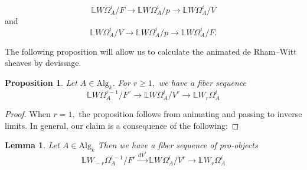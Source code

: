 \documentclass[10pt,letterpaper]{amsart}
\makeatletter
\newcommand{\smallbullet}{} %
\DeclareRobustCommand\smallbullet{%
  \mathord{\mathpalette\smallbullet@{0.7}}%
}
\newcommand{\smallbullet@}[2]{%
  \vcenter{\hbox{\scalebox{#2}{$\m@th#1\bullet$}}}%
}
\numberwithin{figure}{section}
\numberwithin{equation}{section}
\newtheorem{lemma}[figure]{Lemma}
\newtheorem{proposition}[figure]{Proposition}
\theoremstyle{definition}
\theoremstyle{definition}
\theoremstyle{definition}
\theoremstyle{definition}
\newcommand{\LL}{\L}
\renewcommand{\L}{\mathbb{L}}
\makeatother
\begin{document}
\begin{equation}\label{eq200}
    \L W \Omega^i_A /F \to \L W \Omega^i_A/p \to \L W \Omega^i_A/V
\end{equation}and
\begin{equation}\label{eq201}
 \L W \Omega^i_A/V \to \L W \Omega^i_A/p \to \L W \Omega^i_A /F.
\end{equation}{}


The following proposition will allow us to calculate the animated de Rham--Witt sheaves by devissage.

\begin{proposition}\label{Illusieprop}
Let $A \in \mathrm{Alg}_k.$ For $r \ge 1,$ we have a fiber sequence
$$ \L W\Omega^{i-1}_A/F^r \to \L W\Omega^i_A/V^r \to \L W_r\Omega^i_A  $$
\end{proposition}{}

\begin{proof}
    When $r=1,$ the proposition follows from animating \cite[Prop.~3.18]{Luc1} and passing to inverse limits. In general, our claim is a consequence of the following:
\end{proof}{}


\begin{lemma}
    Let $A \in \mathrm{Alg}_k$ Then we have a fiber sequence of pro-objects
$$ \LL W_{{\smallbullet}-r}\Omega^{i-1}_A/F^r  \xrightarrow[]{dV^r} \LL W_{{\smallbullet}}\Omega^i_A/V^r \to \LL W_r\Omega^i_A  $$
\end{lemma}
\end{document}
